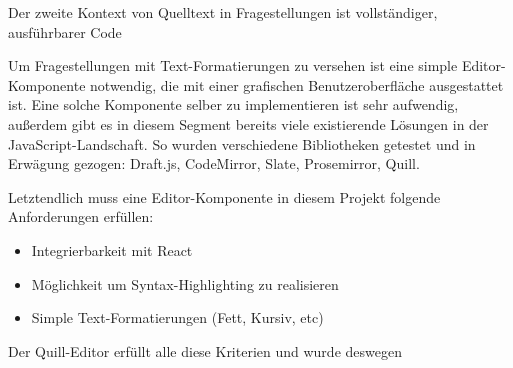 Der zweite Kontext von Quelltext in Fragestellungen ist vollständiger, ausführbarer Code

Um Fragestellungen mit Text-Formatierungen zu versehen ist eine simple Editor-Komponente notwendig, die mit einer grafischen Benutzeroberfläche ausgestattet ist. Eine solche Komponente selber zu implementieren ist sehr aufwendig, außerdem gibt es in diesem Segment bereits viele existierende Lösungen in der JavaScript-Landschaft. So wurden verschiedene Bibliotheken getestet und in Erwägung gezogen: Draft.js, CodeMirror, Slate, Prosemirror, Quill.

Letztendlich muss eine Editor-Komponente in diesem Projekt folgende Anforderungen erfüllen:

\begin{itemize}
    \item Integrierbarkeit mit React
    \item Möglichkeit um Syntax-Highlighting zu realisieren
    \item Simple Text-Formatierungen (Fett, Kursiv, etc)
\end{itemize}

Der Quill-Editor erfüllt alle diese Kriterien und wurde deswegen